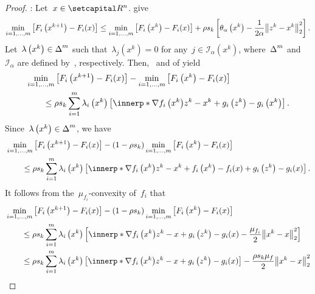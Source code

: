 \documentclass[../../main]{subfiles}
\begin{document}
\begin{proof}
    :
    Let~$x \in \setR^n$.
     give
    \begin{equation}
        \min_{i = 1, \dots, m} \left[F_i\left(x^{k + 1}\right) - F_i(x)\right] \le \min_{i = 1, \dots, m} \left[F_i\left(x^k\right) - F_i(x)\right] + \rho s_k \left[ \theta_\alpha\left(x^k\right) - \frac{1}{2 \alpha} \norm*{z^k - x^k}_2^2 \right]
    .\end{equation} 
    Let~$\lambda\left(x^k\right) \in \operatorname{\Delta}^m$ such that~$\lambda_j\left(x^k\right) = 0$ for any~$j \in \mathcal{I}_\alpha\left(x^k\right)$, where~$\operatorname{\Delta}^m$ and~$\mathcal{I}_\alpha$ are defined by~, respectively.
    Then,~ and  of  yield
    \begin{align}
        \MoveEqLeft \min_{i = 1, \dots, m} \left[F_i\left(x^{k + 1}\right) - F_i(x)\right] - \min_{i = 1, \dots, m} \left[F_i\left(x^k\right) - F_i(x)\right] \\
        &\le \rho s_k \sum_{i = 1}^{m} \lambda_i\left(x^k\right) \left[ \innerp*{\nabla f_i\left(x^k\right)}{z^k - x^k} + g_i\left(z^k\right) - g_i\left(x^k\right) \right]
    .\end{align} 
    Since~$\lambda\left(x^k\right) \in \operatorname{\Delta}^m$, we have
    \begin{align}
        \MoveEqLeft \min_{i = 1, \dots, m} \left[F_i\left(x^{k + 1}\right) - F_i(x)\right] - (1 - \rho s_k) \min_{i = 1, \dots, m}\left[F_i\left(x^k\right) - F_i(x)\right] \\
             &\le \rho s_k \sum_{i = 1}^{m} \lambda_i\left(x^k\right) \left[ \innerp*{\nabla f_i\left(x^k\right)}{z^k - x^k} + f_i\left(x^k\right) - f_i(x) + g_i\left(z^k\right) - g_i(x) \right]
    .\end{align} 
    It follows from the~$\mu_{f_i}$-convexity of~$f_i$ that
    \begin{align}
        \MoveEqLeft \min_{i = 1, \dots, m} \left[F_i\left(x^{k + 1}\right) - F_i(x)\right] - (1 - \rho s_k) \min_{i = 1, \dots, m}\left[F_i\left(x^k\right) - F_i(x)\right] \\
             &\le \rho s_k \sum_{i = 1}^{m} \lambda_i\left(x^k\right) \left[ \innerp*{\nabla f_i\left(x^k\right)}{z^k - x} + g_i\left(z^k\right) - g_i(x) - \frac{\mu_{f_i}}{2} \norm*{x^k - x}_2^2 \right] \\
             &\le \rho s_k \sum_{i = 1}^{m} \lambda_i\left(x^k\right) \left[ \innerp*{\nabla f_i\left(x^k\right)}{z^k - x} + g_i\left(z^k\right) - g_i(x) \right] - \frac{\rho s_k \mu_f}{2} \norm*{x^k - x}_2^2

\end{align}
\end{proof}
\end{document}
